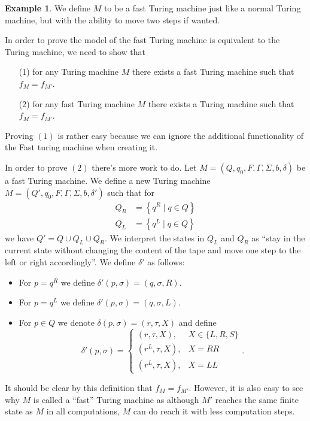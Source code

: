 \documentclass[11pt,a4paper]{article}
\theoremstyle{definition}
\newtheorem{example}{Example}[section]
\theoremstyle{plain}
\newcommand{\set}[2]{ \left\{ #1 \mid #2 \right\} }
\begin{document}
  \begin{example}
    We define $M$ to be a fast Turing machine just like a normal Turing 
    machine, but with the ability to move two steps if wanted.

    In order to prove the model of the fast Turing machine is equivalent
    to the Turing machine, we need to show that
    \begin{enumerate}
      \item[(1)] for any Turing machine $M$ there exists a fast Turing machine
        such that $f_M = f_{M'}$.
      \item[(2)] for any fast Turing machine $M$ there exists a Turing machine
        such that $f_M = f_{M'}$.
    \end{enumerate}
    Proving $(1)$ is rather easy because we can ignore the additional
    functionality of the Fast turing machine when creating it.

    In order to prove $(2)$ there's more work to do.
    Let $M = (Q,q_0,F,\Gamma,\Sigma,b,\delta)$ be a fast Turing machine.
    We define a new Turing machine $M = (Q',q_0,F,\Gamma,\Sigma,b,\delta')$
    such that for
    \begin{align*}
      Q_R &= \set{q^R}{q \in Q} \\
      Q_L &= \set{q^L}{q \in Q}
    \end{align*}
    we have $Q' = Q \cup Q_L \cup Q_R$.
    We interpret the states in $Q_L$ and $Q_R$ as ``stay in the current state
    without changing the content of the tape and move one step to the left
    or right accordingly''.
    We define $\delta'$ as follows:
    \begin{itemize}
      \item For $p = q^R$ we define $\delta'(p,\sigma) = (q,\sigma,R)$.
      \item For $p = q^L$ we define $\delta'(p,\sigma) = (q,\sigma,L)$.
      \item For $p \in Q$ we denote $\delta(p,\sigma) = (r,\tau,X)$ and
        define
        \[
          \delta'(p,\sigma) =
          \begin{cases}
            (r,\tau,X), &X \in \{L,R,S\} \\
            (r^L,\tau,X), &X = RR \\
            (r^L,\tau,X), &X = LL
          \end{cases}.
        \]
    \end{itemize}
    It should be clear by this definition that $f_M = f_{M'}$.
    However, it is also easy to see why $M$ is called a ``fast'' Turing
    machine as although $M'$ reaches the same finite state as $M$ in
    all computations, $M$ can do reach it with less computation steps.
  \end{example}
\end{document}
